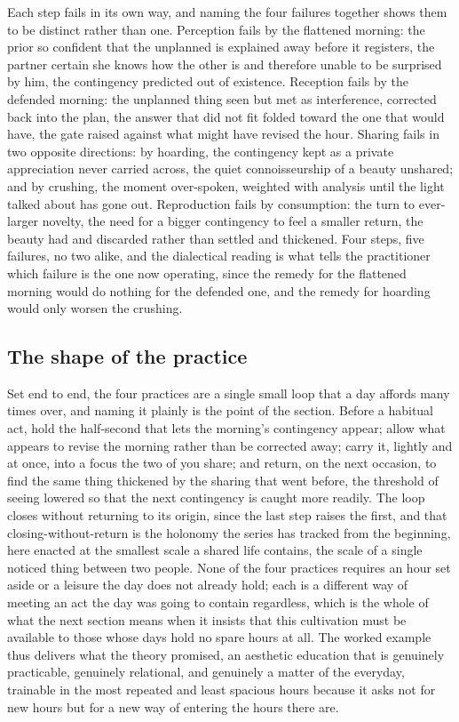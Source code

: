 \begin{casebox}
Each step fails in its own way, and naming the four failures together shows them to be distinct rather than one. Perception fails by the flattened morning: the prior so confident that the unplanned is explained away before it registers, the partner certain she knows how the other is and therefore unable to be surprised by him, the contingency predicted out of existence. Reception fails by the defended morning: the unplanned thing seen but met as interference, corrected back into the plan, the answer that did not fit folded toward the one that would have, the gate raised against what might have revised the hour. Sharing fails in two opposite directions: by hoarding, the contingency kept as a private appreciation never carried across, the quiet connoisseurship of a beauty unshared; and by crushing, the moment over-spoken, weighted with analysis until the light talked about has gone out. Reproduction fails by consumption: the turn to ever-larger novelty, the need for a bigger contingency to feel a smaller return, the beauty had and discarded rather than settled and thickened. Four steps, five failures, no two alike, and the dialectical reading is what tells the practitioner which failure is the one now operating, since the remedy for the flattened morning would do nothing for the defended one, and the remedy for hoarding would only worsen the crushing.
\end{casebox}

\subsection{The shape of the practice}
\label{p22:sub:we-shape}

Set end to end, the four practices are a single small loop that a day affords many times over, and naming it plainly is the point of the section. Before a habitual act, hold the half-second that lets the morning's contingency appear; allow what appears to revise the morning rather than be corrected away; carry it, lightly and at once, into a focus the two of you share; and return, on the next occasion, to find the same thing thickened by the sharing that went before, the threshold of seeing lowered so that the next contingency is caught more readily. The loop closes without returning to its origin, since the last step raises the first, and that closing-without-return is the holonomy the series has tracked from the beginning, here enacted at the smallest scale a shared life contains, the scale of a single noticed thing between two people. None of the four practices requires an hour set aside or a leisure the day does not already hold; each is a different way of meeting an act the day was going to contain regardless, which is the whole of what the next section means when it insists that this cultivation must be available to those whose days hold no spare hours at all. The worked example thus delivers what the theory promised, an aesthetic education that is genuinely practicable, genuinely relational, and genuinely a matter of the everyday, trainable in the most repeated and least spacious hours because it asks not for new hours but for a new way of entering the hours there are.

